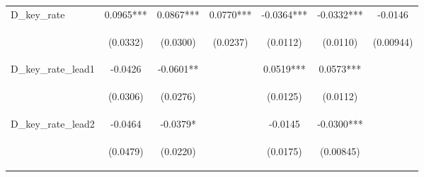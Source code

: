 \documentclass[]{article}
\begin{document}
\begin{center}
\begin{tabular}{lcccccc}
D\_key\_rate & 0.0965*** & 0.0867*** & 0.0770*** & -0.0364*** & -0.0332*** & -0.0146 \\
\vspace{4pt} & \begin{footnotesize}(0.0332)\end{footnotesize} & \begin{footnotesize}(0.0300)\end{footnotesize} & \begin{footnotesize}(0.0237)\end{footnotesize} & \begin{footnotesize}(0.0112)\end{footnotesize} & \begin{footnotesize}(0.0110)\end{footnotesize} & \begin{footnotesize}(0.00944)\end{footnotesize} \\
D\_key\_rate\_lead1 & -0.0426 & -0.0601** &  & 0.0519*** & 0.0573*** &  \\
\vspace{4pt} & \begin{footnotesize}(0.0306)\end{footnotesize} & \begin{footnotesize}(0.0276)\end{footnotesize} & \begin{footnotesize}\end{footnotesize} & \begin{footnotesize}(0.0125)\end{footnotesize} & \begin{footnotesize}(0.0112)\end{footnotesize} & \begin{footnotesize}\end{footnotesize} \\
D\_key\_rate\_lead2 & -0.0464 & -0.0379* &  & -0.0145 & -0.0300*** &  \\
\vspace{4pt} & \begin{footnotesize}(0.0479)\end{footnotesize} & \begin{footnotesize}(0.0220)\end{footnotesize} & \begin{footnotesize}\end{footnotesize} & \begin{footnotesize}(0.0175)\end{footnotesize} & \begin{footnotesize}(0.00845)\end{footnotesize} & \begin{footnotesize}\end{footnotesize} \\

\end{tabular}
\end{center}
\end{document}
